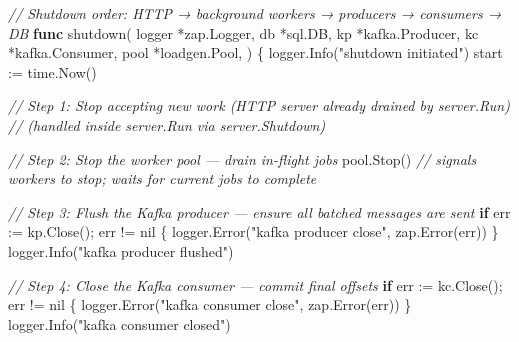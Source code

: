 \documentclass[
]{article}
\newenvironment{Shaded}{}{}
\newcommand{\CommentTok}[1]{\textcolor[rgb]{0.38,0.63,0.69}{\textit{#1}}}
\newcommand{\ControlFlowTok}[1]{\textcolor[rgb]{0.00,0.44,0.13}{\textbf{#1}}}
\newcommand{\KeywordTok}[1]{\textcolor[rgb]{0.00,0.44,0.13}{\textbf{#1}}}
\newcommand{\NormalTok}[1]{#1}
\newcommand{\OperatorTok}[1]{\textcolor[rgb]{0.40,0.40,0.40}{#1}}
\newcommand{\OtherTok}[1]{\textcolor[rgb]{0.00,0.44,0.13}{#1}}
\newcommand{\StringTok}[1]{\textcolor[rgb]{0.25,0.44,0.63}{#1}}
\begin{document}
\begin{Shaded}
\begin{Highlighting}[]
\CommentTok{// Shutdown order: HTTP → background workers → producers → consumers → DB}
\KeywordTok{func}\NormalTok{ shutdown}\OperatorTok{(}
\NormalTok{    logger }\OperatorTok{*}\NormalTok{zap}\OperatorTok{.}\NormalTok{Logger}\OperatorTok{,}
\NormalTok{    db }\OperatorTok{*}\NormalTok{sql}\OperatorTok{.}\NormalTok{DB}\OperatorTok{,}
\NormalTok{    kp }\OperatorTok{*}\NormalTok{kafka}\OperatorTok{.}\NormalTok{Producer}\OperatorTok{,}
\NormalTok{    kc }\OperatorTok{*}\NormalTok{kafka}\OperatorTok{.}\NormalTok{Consumer}\OperatorTok{,}
\NormalTok{    pool }\OperatorTok{*}\NormalTok{loadgen}\OperatorTok{.}\NormalTok{Pool}\OperatorTok{,}
\OperatorTok{)} \OperatorTok{\{}
\NormalTok{    logger}\OperatorTok{.}\NormalTok{Info}\OperatorTok{(}\StringTok{"shutdown initiated"}\OperatorTok{)}
\NormalTok{    start }\OperatorTok{:=}\NormalTok{ time}\OperatorTok{.}\NormalTok{Now}\OperatorTok{()}

    \CommentTok{// Step 1: Stop accepting new work (HTTP server already drained by server.Run)}
    \CommentTok{// (handled inside server.Run via server.Shutdown)}

    \CommentTok{// Step 2: Stop the worker pool — drain in{-}flight jobs}
\NormalTok{    pool}\OperatorTok{.}\NormalTok{Stop}\OperatorTok{()} \CommentTok{// signals workers to stop; waits for current jobs to complete}

    \CommentTok{// Step 3: Flush the Kafka producer — ensure all batched messages are sent}
    \ControlFlowTok{if}\NormalTok{ err }\OperatorTok{:=}\NormalTok{ kp}\OperatorTok{.}\NormalTok{Close}\OperatorTok{();}\NormalTok{ err }\OperatorTok{!=} \OtherTok{nil} \OperatorTok{\{}
\NormalTok{        logger}\OperatorTok{.}\NormalTok{Error}\OperatorTok{(}\StringTok{"kafka producer close"}\OperatorTok{,}\NormalTok{ zap}\OperatorTok{.}\NormalTok{Error}\OperatorTok{(}\NormalTok{err}\OperatorTok{))}
    \OperatorTok{\}}
\NormalTok{    logger}\OperatorTok{.}\NormalTok{Info}\OperatorTok{(}\StringTok{"kafka producer flushed"}\OperatorTok{)}

    \CommentTok{// Step 4: Close the Kafka consumer — commit final offsets}
    \ControlFlowTok{if}\NormalTok{ err }\OperatorTok{:=}\NormalTok{ kc}\OperatorTok{.}\NormalTok{Close}\OperatorTok{();}\NormalTok{ err }\OperatorTok{!=} \OtherTok{nil} \OperatorTok{\{}
\NormalTok{        logger}\OperatorTok{.}\NormalTok{Error}\OperatorTok{(}\StringTok{"kafka consumer close"}\OperatorTok{,}\NormalTok{ zap}\OperatorTok{.}\NormalTok{Error}\OperatorTok{(}\NormalTok{err}\OperatorTok{))}
    \OperatorTok{\}}
\NormalTok{    logger}\OperatorTok{.}\NormalTok{Info}\OperatorTok{(}\StringTok{"kafka consumer closed"}\OperatorTok{)}


\end{Highlighting}
\end{Shaded}
\end{document}
